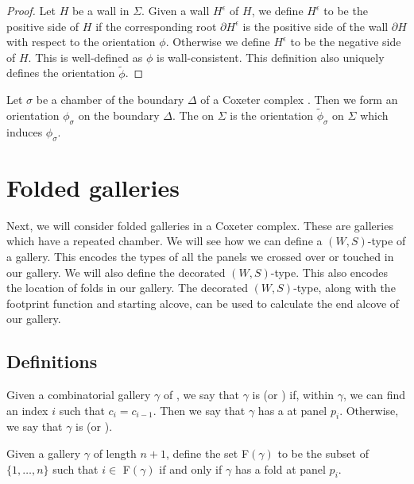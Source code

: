 \documentclass[11pt]{article}
\begin{document}
\begin{proof}
    Let $H$ be a wall in $\Sigma$. Given a wall $H^\epsilon$ of $H$, we define $H^\epsilon$ to be the positive side of $H$ if the corresponding root $\partial H^\epsilon$ is the positive side of the wall $\partial H$ with respect to the orientation $\phi$. Otherwise we define $H^\epsilon$ to be the negative side of $H$. This is well-defined as $\phi$ is wall-consistent. This definition also uniquely defines the orientation $\tilde{\phi}$. 
\end{proof}

\begin{definition}
    Let $\sigma$ be a chamber of the boundary $\Delta$ of a Coxeter complex \sg. Then we form an orientation $\phi_{\sigma}$ on the boundary $\Delta$. The  on $\Sigma$ is the orientation $\tilde{\phi}_\sigma$ on $\Sigma$ which induces $\phi_{\sigma}$. 
\end{definition}


\section{Folded galleries}\label{7}

Next, we will consider folded galleries in a Coxeter complex. These are galleries which have a repeated chamber. We will see how we can define a $(W,S)$-type of a gallery. This encodes the types of all the panels we crossed over or touched in our gallery. We will also define the decorated $(W,S)$-type. This also encodes the location of folds in our gallery. The decorated $(W,S)$-type, along with the footprint function and starting alcove, can be used to calculate the end alcove of our gallery. 

\subsection{Definitions}


\begin{definition}
    Given a combinatorial gallery $\gamma$ of \sg, we say that $\gamma$ is  (or ) if, within $\gamma$, we can find an index $i$ such that $c_i=c_{i-1}$. Then we say that $\gamma$ has a  at panel $p_i$. Otherwise, we say that $\gamma$ is  (or ).  
\end{definition}

\begin{definition}
    Given a gallery $\gamma$ of length $n+1$, define the set F$(\gamma)$ to be the subset of $\{1,\hdots ,n\}$ such that $i\in$ F$(\gamma)$ if and only if $\gamma$ has a fold at panel $p_i$. 
\end{definition}
\end{document}

